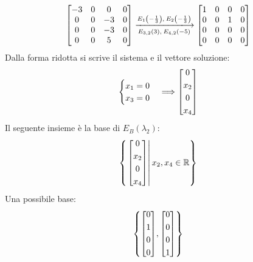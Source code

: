 \documentclass[a4paper]{article}
\makeatletter
\newenvironment{rowequmatbra}[1]{\left[\array{@{}#1@{}}}{\endarray\right]}
\makeatother
\begin{document}
	\begin{equation*}
		\begin{rowequmatbra}{cccc}
			-3 & 0 & 0 & 0 	\\
			0 & 0 & -3 & 0 	\\
			0 & 0 & -3 & 0 	\\
			0 & 0 & 5 & 0
		\end{rowequmatbra}
		\xlongrightarrow[E_{3,2}\left(3\right),\: E_{4,2}\left(-5\right)]{E_{1}\left(-\frac{1}{3}\right),\: E_{2}\left(-\frac{1}{3}\right)}
		\begin{rowequmatbra}{cccc}
			1 & 0 & 0 & 0 	\\
			0 & 0 & 1 & 0 	\\
			0 & 0 & 0 & 0 	\\
			0 & 0 & 0 & 0
		\end{rowequmatbra}
	\end{equation*}
	Dalla forma ridotta si scrive il sistema e il vettore soluzione:
	\begin{equation*}
		\begin{cases}
			x_{1} = 0 \\
			x_{3} = 0
		\end{cases}
		\Longrightarrow
		\begin{rowequmatbra}{c}
			0 \\ [0.3em]
			x_{2} \\ [0.3em]
			0 \\ [0.3em]
			x_{4}
		\end{rowequmatbra}
	\end{equation*}
	Il seguente insieme è la base di $E_{B}\left(\lambda_{2}\right)$:
	\begin{equation*}
		\left\{
		\left.
		\begin{rowequmatbra}{c}
			0 \\ [0.3em]
			x_{2} \\ [0.3em]
			0 \\ [0.3em]
			x_{4}
		\end{rowequmatbra}
		\right| x_{2},x_{4} \in \mathbb{R}
		\right\}
	\end{equation*}
	Una possibile base:
	\begin{equation*}
		\left\{
		\begin{rowequmatbra}{c}
			0 \\ [0.3em]
			1 \\ [0.3em]
			0 \\ [0.3em]
			0
		\end{rowequmatbra}, 	\begin{rowequmatbra}{c}
			0 \\ [0.3em]
			0 \\ [0.3em]
			0 \\ [0.3em]
			1
		\end{rowequmatbra}
		\right\}
	\end{equation*}
	\newpage
	
\end{document}
